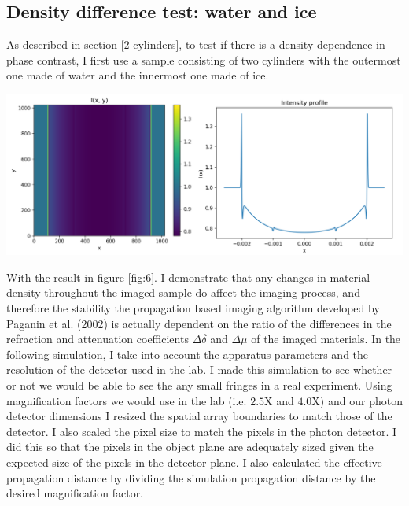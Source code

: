\documentclass[10pt, a4paper, singlespacing]{report}
\newenvironment{Figure}
    {\par\medskip\noindent\minipage{\linewidth}}
    {\endminipage\par\medskip}
\begin{document}
\subsection{Density difference test: water and ice}
As described in section \ref{2 cylinders}, to test if there is a density dependence in phase contrast, I first use a sample consisting of two cylinders with the outermost one made of water and the innermost one made of ice.
\begin{Figure}\label{fig:6}
\centering
\includegraphics[width=\linewidth]{ice_water_AS.pdf}
\end{Figure}
With the result in figure \ref{fig:6}. I demonstrate that any changes in material density throughout the imaged sample do affect the imaging process, and therefore the stability the propagation based imaging algorithm developed by Paganin et al. (2002) is actually dependent on the ratio of the differences in the refraction and attenuation coefficients $\Delta \delta$ and $\Delta \mu$ of the imaged materials.
In the following simulation, I take into account the apparatus parameters and the resolution of the detector used in the lab. I made this simulation to see whether or not we would be able to see the any small fringes in a real experiment. Using magnification factors we would use in the lab (i.e. $2.5$X and $4.0$X) and our photon detector dimensions I resized the spatial array boundaries to match those of the detector. I also scaled the pixel size to match the pixels in the photon detector. I did this so that the pixels in the object plane are adequately sized given the expected size of the pixels in the detector plane. I also calculated the effective propagation distance by dividing the simulation propagation distance by the desired magnification factor.
\end{document}
